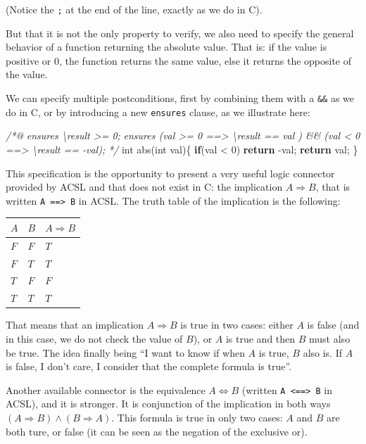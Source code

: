 \documentclass[12pt,francais,]{scrbook}
\newenvironment{Shaded}{}{}
\newcommand{\KeywordTok}[1]{\textcolor[rgb]{0.00,0.44,0.13}{\textbf{{#1}}}}
\newcommand{\DataTypeTok}[1]{\textcolor[rgb]{0.56,0.13,0.00}{{#1}}}
\newcommand{\DecValTok}[1]{\textcolor[rgb]{0.25,0.63,0.44}{{#1}}}
\newcommand{\CommentTok}[1]{\textcolor[rgb]{0.38,0.63,0.69}{\textit{{#1}}}}
\newcommand{\NormalTok}[1]{{#1}}
\begin{document}
(Notice the \texttt{;} at the end of the line, exactly as we do in C).

But that it is not the only property to verify, we also need to specify
the general behavior of a function returning the absolute value. That
is: if the value is positive or 0, the function returns the same value,
else it returns the opposite of the value.

We can specify multiple postconditions, first by combining them with a
\texttt{\&\&} as we do in C, or by introducing a new \texttt{ensures}
clause, as we illustrate here:

\begin{footnotesize}\begin{Shaded}
\begin{Highlighting}[]
\CommentTok{/*@}
\CommentTok{  ensures \textbackslash{}result >= 0;}
\CommentTok{  ensures (val >= 0 ==> \textbackslash{}result == val ) && }
\CommentTok{          (val <  0 ==> \textbackslash{}result == -val);}
\CommentTok{*/}
\DataTypeTok{int} \NormalTok{abs(}\DataTypeTok{int} \NormalTok{val)\{}
  \KeywordTok{if}\NormalTok{(val < }\DecValTok{0}\NormalTok{) }\KeywordTok{return} \NormalTok{-val;}
  \KeywordTok{return} \NormalTok{val;}
\NormalTok{\}}
\end{Highlighting}
\end{Shaded}\end{footnotesize}

This specification is the opportunity to present a very useful logic
connector provided by ACSL and that does not exist in C: the implication
\(A \Rightarrow B\), that is written \texttt{A\ ==\textgreater{}\ B} in
ACSL. The truth table of the implication is the following:

\begin{longtable}[]{@{}lll@{}}
\toprule
\(A\) & \(B\) & \(A \Rightarrow B\)\tabularnewline
\midrule
\endhead
\(F\) & \(F\) & \(T\)\tabularnewline
\(F\) & \(T\) & \(T\)\tabularnewline
\(T\) & \(F\) & \(F\)\tabularnewline
\(T\) & \(T\) & \(T\)\tabularnewline
\bottomrule
\end{longtable}

That means that an implication \(A \Rightarrow B\) is true in two cases:
either \(A\) is false (and in this case, we do not check the value of
\(B\)), or \(A\) is true and then \(B\) must also be true. The idea
finally being ``I want to know if when \(A\) is true, \(B\) also is. If
\(A\) is false, I don't care, I consider that the complete formula is
true''.

Another available connector is the equivalence \(A \Leftrightarrow B\)
(written \texttt{A\ \textless{}==\textgreater{}\ B} in ACSL), and it is
stronger. It is conjunction of the implication in both ways
\((A \Rightarrow B) \wedge (B \Rightarrow A)\). This formula is true in
only two cases: \(A\) and \(B\) are both ture, or false (it can be seen
as the negation of the exclusive or).
\end{document}
